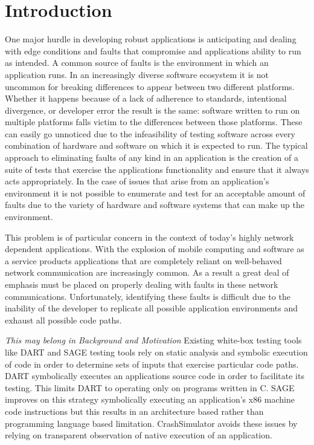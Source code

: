 \section{Introduction}

    One major hurdle in developing robust applications is anticipating and dealing with edge conditions and faults that
    compromise and applications ability to run as intended. A common source of faults is the environment in which an
    application runs. In an increasingly diverse software ecosystem it is not uncommon for breaking differences to
    appear between two different platforms. Whether it happens because of a lack of adherence to standards, intentional
    divergence, or developer error the result is the same: software written to run on multiple platforms falls victim to
    the differences between those platforms. These can easily go unnoticed due to the infeasibility of testing software
    across every combination of hardware and software on which it is expected to run. The typical approach to
    eliminating faults of any kind in an application is the creation of a suite of tests that exercise the applications
    functionality and ensure that it always acts appropriately. In the case of issues that arise from an application's
    environment it is not possible to enumerate and test for an acceptable amount of faults due to the variety of
    hardware and software systems that can make up the environment.

    This problem is of particular concern in the context of today's highly network dependent applications. With the
    explosion of mobile computing and software as a service products applications that are completely reliant on
    well-behaved network communication are increasingly common. As a result a great deal of emphasis must be placed on
    properly dealing with faults in these network communications. Unfortunately, identifying these faults is difficult
    due to the inability of the developer to replicate all possible application environments and exhaust all possible
    code paths.

    \emph{This may belong in Background and Motivation} Existing white-box testing tools like DART and SAGE testing
    tools rely on static analysis and symbolic execution of code in order to determine sets of inputs that exercise
    particular code paths. DART symbolically executes an applications source code in order to facilitate its testing.
    This limits DART to operating only on programs written in C. SAGE improves on this strategy symbolically executing
    an application's x86 machine code instructions but this results in an architecture based rather than programming
    language based limitation. CrashSimulator avoids these issues by relying on transparent observation of native
    execution of an application.

